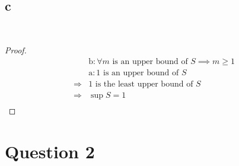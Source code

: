 \documentclass{article}
\begin{document}
~

\subsection*{c}

~

\begin{proof}
    \begin{align*}
        &\text{b}:\forall m\text{ is an upper bound of }S\implies m\geqslant 1\\
        &\text{a}:1\text{ is an upper bound of }S\\
        \Rightarrow&1\text{ is the least upper bound of }S\\
        \Rightarrow&\sup S=1\\
    \end{align*}
\end{proof}

\newpage

\section*{Question 2}

~
\end{document}
